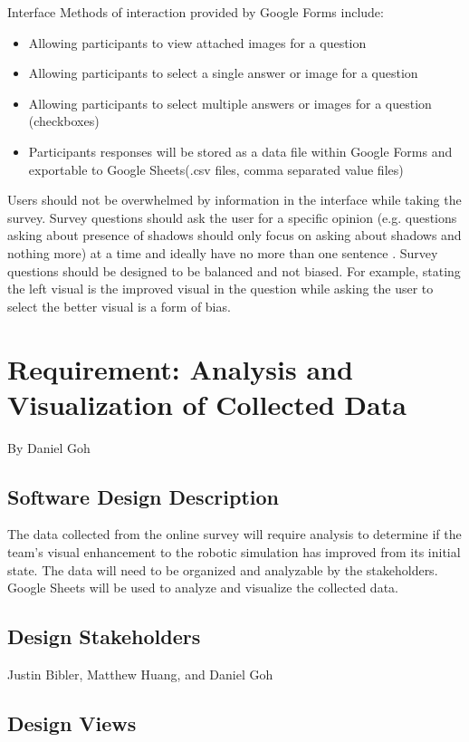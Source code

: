 \documentclass[10pt,journal,compsoc,draftclsnofoot]{IEEEtran}
\makeatletter
\newcommand\subparagraph{%
  \@startsection{subparagraph}{5}
  {\parindent}
  {3.25ex \@plus 1ex \@minus .2ex}
  {0.75ex plus 0.1ex}
  {\normalfont\normalsize\bfseries}}
\makeatother
\begin{document}
\begin{flushleft}
\subparagraph{Interface}
Methods of interaction provided by Google Forms include:
\begin{itemize}
\item Allowing participants to view attached images for a question
\item Allowing participants to select a single answer or image for a question
\item Allowing participants to select multiple answers or images for a question  (checkboxes)
\item Participants responses will be stored as a data file within Google Forms and exportable to Google Sheets(.csv files, comma separated value files)
\end{itemize}

Users should not be overwhelmed by information in the interface while taking the survey.
Survey questions should ask the user for a specific opinion (e.g. questions asking about presence of shadows should only focus on asking about shadows and nothing more) at a time and ideally have no more than one sentence \cite{SMquestions}. 
Survey questions should be designed to be balanced and not biased.
For example, stating the left visual is the improved visual in the question while asking the user to select the better visual is a form of bias.  

\newpage

\section{Requirement: Analysis and Visualization of Collected Data}
\large{By Daniel Goh}

\normalsize
\subsection{Software Design Description}
The data collected from the online survey will require analysis to determine if the team's visual enhancement to the robotic simulation has improved from its initial state.
The data will need to be organized and analyzable by the stakeholders.
Google Sheets will be used to analyze and visualize the collected data.

\subsection{Design Stakeholders}
Justin Bibler, Matthew Huang, and Daniel Goh

\subsection{Design Views}

\end{flushleft}
\end{document}
